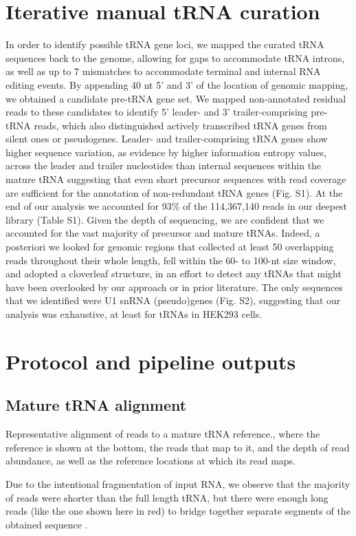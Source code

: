 \documentclass[12pt]{rockefeller}
\begin{document}
\section{Iterative manual tRNA curation}
In order to identify possible tRNA gene loci, we mapped the curated tRNA sequences back to the genome, allowing for gaps to accommodate tRNA introns, as well as up to 7 mismatches to accommodate terminal and internal RNA editing events. By appending 40 nt 5’ and 3’ of the location of genomic mapping, we obtained a candidate pre-tRNA gene set. We mapped non-annotated residual reads to these candidates to identify 5’ leader- and 3’ trailer-comprising pre-tRNA reads, which also distinguished actively transcribed tRNA genes from silent ones or pseudogenes. Leader- and trailer-comprising tRNA genes show higher sequence variation, as evidence by higher information entropy values, across the leader and trailer nucleotides than internal sequences within the mature tRNA suggesting that even short precursor sequences with read coverage are sufficient for the annotation of non-redundant tRNA genes (Fig. S1). At the end of our analysis we accounted for 93\% of the 114,367,140 reads in our deepest library (Table S1). Given the depth of sequencing, we are confident that we accounted for the vast majority of precursor and mature tRNAs. Indeed, a posteriori we looked for genomic regions that collected at least 50 overlapping reads throughout their whole length, fell within the 60- to 100-nt size window, and adopted a cloverleaf structure, in an effort to detect any tRNAs that might have been overlooked by our approach or in prior literature. The only sequences that we identified were U1 snRNA (pseudo)genes (Fig. S2), suggesting that our analysis was exhaustive, at least for tRNAs in HEK293 cells. 

\section{Protocol and pipeline outputs}
\subsection{Mature tRNA alignment}

Representative alignment of reads to a mature tRNA reference., where the reference is shown at the bottom, the reads that map to it, and the depth of read abundance, as well as the reference locations at which its read maps. 

Due to the intentional fragmentation of input RNA, we observe that the majority of reads were shorter than the full length tRNA, but there were enough long reads (like the one shown here in red) to bridge together separate segments of the obtained sequence . 
\end{document}
